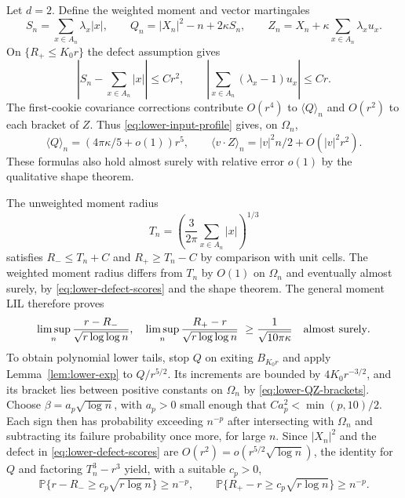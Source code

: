 Let $d=2$.  Define the weighted moment and vector martingales
\[
 S_n=\sum_{x\in A_n}\lambda_x|x|,\qquad
 Q_n=|X_n|^2-n+2\kappa S_n,\qquad
 Z_n=X_n+\kappa\sum_{x\in A_n}\lambda_xu_x.
\]
On $\{R_+\leq K_0r\}$ the defect assumption gives
\begin{equation}\label{eq:lower-defect-scores}
 \left|S_n-\sum_{x\in A_n}|x|\right|\leq Cr^2,
 \qquad
 \left|\sum_{x\in A_n}(\lambda_x-1)u_x\right|\leq Cr.
\end{equation}
The first-cookie covariance corrections contribute $O(r^4)$ to
$\langle Q\rangle_n$ and $O(r^2)$ to each bracket of $Z$.
Thus \eqref{eq:lower-input-profile} gives, on $\Omega_n$,
\begin{equation}\label{eq:lower-QZ-brackets}
 \langle Q\rangle_n=(4\pi\kappa/5+o(1))r^5,
 \qquad
 \langle v\cdot Z\rangle_n=|v|^2n/2+O(|v|^2r^2).
\end{equation}
These formulas also hold almost surely with relative error $o(1)$
by the qualitative shape theorem.

The unweighted moment radius
\[
 T_n=\left(\frac3{2\pi}\sum_{x\in A_n}|x|\right)^{1/3}
\]
satisfies $R_-\leq T_n+C$ and $R_+\geq T_n-C$ by comparison
with unit cells.  The weighted moment radius differs from $T_n$
by $O(1)$ on $\Omega_n$ and eventually almost surely, by
\eqref{eq:lower-defect-scores} and the shape theorem.
The general moment LIL therefore proves
\begin{equation}\label{eq:lower-radii-lil}
 \limsup_n\frac{r-R_-}{\sqrt{r\log\log n}},\quad
 \limsup_n\frac{R_+-r}{\sqrt{r\log\log n}}
 \ \geq\frac1{\sqrt{10\pi\kappa}}\quad\hbox{almost surely}.
\end{equation}
To obtain polynomial lower tails, stop $Q$ on exiting $B_{K_0r}$
and apply Lemma~\ref{lem:lower-exp} to $Q/r^{5/2}$.
Its increments are bounded by $4K_0r^{-3/2}$, and its bracket lies
between positive constants on $\Omega_n$ by
\eqref{eq:lower-QZ-brackets}.
Choose $\beta=a_p\sqrt{\log n}$, with $a_p>0$ small enough that
$Ca_p^2<\min(p,10)/2$.  Each sign then has probability exceeding
$n^{-p}$ after intersecting with $\Omega_n$ and subtracting its
failure probability once more, for large $n$.
Since $|X_n|^2$ and the defect in \eqref{eq:lower-defect-scores}
are $O(r^2)=o(r^{5/2}\sqrt{\log n})$, the identity for $Q$ and
factoring $T_n^3-r^3$ yield, with a suitable $c_p>0$,
\begin{equation}\label{eq:lower-radii-tails}
 \mathbb P\{r-R_-\geq c_p\sqrt{r\log n}\}\geq n^{-p},
 \qquad
 \mathbb P\{R_+-r\geq c_p\sqrt{r\log n}\}\geq n^{-p}.
\end{equation}

